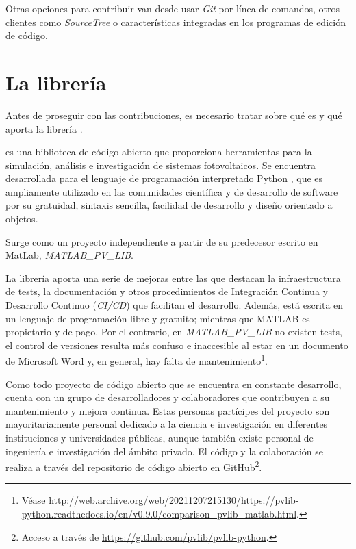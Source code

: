 Otras opciones para contribuir van desde usar \textit{Git} por línea de comandos, otros clientes como \textit{SourceTree} o características integradas en los programas de edición de código.

\section{La librería \pvlibpy} \label{sct:pvlib}

Antes de proseguir con las contribuciones, es necesario tratar sobre qué es y qué aporta la librería \pvlibpy.

\pvlibpy{} es una biblioteca de código abierto que proporciona herramientas para la simulación, análisis e investigación de sistemas fotovoltaicos. Se encuentra desarrollada para el lenguaje de programación interpretado Python \cite{CS-R9526}, que es ampliamente utilizado en las comunidades científica y de desarrollo de software por su gratuidad, sintaxis sencilla, facilidad de desarrollo y diseño orientado a objetos.

Surge como un proyecto independiente a partir de su predecesor escrito en MatLab, \textit{MATLAB\_PV\_LIB}.

La librería \pvlibpy{} aporta una serie de mejoras entre las que destacan la infraestructura de tests, la documentación y otros procedimientos de Integración Continua y Desarrollo Continuo (\textit{CI/CD}) que facilitan el desarrollo. Además, está escrita en un lenguaje de programación libre y gratuito; mientras que MATLAB es propietario y de pago. Por el contrario, en \textit{MATLAB\_PV\_LIB} no existen tests, el control de versiones resulta más confuso e inaccesible al estar en un documento de Microsoft Word y, en general, hay falta de mantenimiento\footnote{Véase \url{http://web.archive.org/web/20211207215130/https://pvlib-python.readthedocs.io/en/v0.9.0/comparison_pvlib_matlab.html}.}.

Como todo proyecto de código abierto que se encuentra en constante desarrollo, \pvlibpy{} cuenta con un grupo de desarrolladores y colaboradores que contribuyen a su mantenimiento y mejora continua. Estas personas partícipes del proyecto son mayoritariamente personal dedicado a la ciencia e investigación en diferentes instituciones y universidades públicas, aunque también existe personal de ingeniería e investigación del ámbito privado. El código y la colaboración se realiza a través del repositorio de código abierto en GitHub\footnote{Acceso a través de \url{https://github.com/pvlib/pvlib-python}.}.

